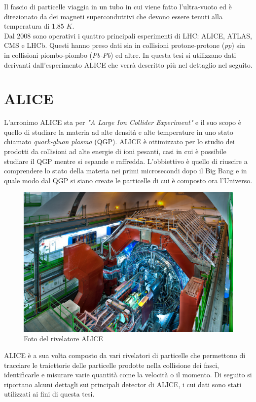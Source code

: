 Il fascio di particelle viaggia in un tubo in cui viene fatto l'ultra-vuoto ed è direzionato da dei magneti superconduttivi che devono essere tenuti alla temperatura di 1.85 $K$.
\\Dal 2008 sono operativi i quattro principali esperimenti di LHC: ALICE, ATLAS, CMS e LHCb. Questi hanno preso dati sia in
collisioni protone-protone (\textit{pp}) sin in collisioni piombo-piombo (\textit{Pb-Pb}) ed altre. In questa tesi si utilizzano dati derivanti dall'esperimento ALICE che verrà  descritto più nel dettaglio nel seguito. \cite{sito_cern_LHC}


\section{ALICE}

L'acronimo ALICE sta per \textit{"A Large Ion Collider Experiment"} e il suo scopo è quello di studiare la materia ad alte densità e alte temperature in uno stato chiamato \textit{quark-gluon plasma} (QGP). ALICE è ottimizzato per lo studio dei prodotti da collisioni ad alte energie di ioni pesanti, casi in cui è possibile studiare il QGP mentre si espande e raffredda. L'obbiettivo è quello di riuscire a comprendere lo stato della materia nei primi microsecondi dopo il Big Bang e in quale modo dal QGP si siano create le particelle di cui è composto ora l'Universo. \cite{sito_cern_ALICE} 
    
    \begin{figure}[htbp]
        \centering
        \includegraphics[width=0.6\linewidth]{ALICE/ALICE_LRsaba_CERN_0212_3219.jpg}
        \caption{Foto del rivelatore ALICE}
        \label{fig:ALICEcomplex}
    \end{figure}
    
ALICE è a sua volta composto da vari rivelatori di particelle che permettono di tracciare le traiettorie delle particelle prodotte nella collisione dei fasci, identificarle e misurare varie quantità come la velocità o il momento. Di seguito si riportano alcuni dettagli sui principali detector di ALICE, i cui dati sono stati utilizzati ai fini di questa tesi.


